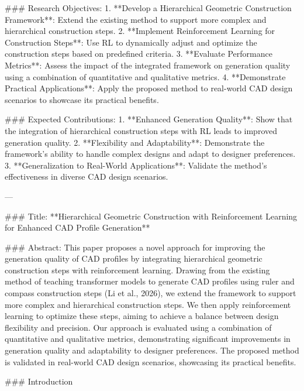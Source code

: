 ### Research Objectives:
1. **Develop a Hierarchical Geometric Construction Framework**: Extend the existing method to support more complex and hierarchical construction steps.
2. **Implement Reinforcement Learning for Construction Steps**: Use RL to dynamically adjust and optimize the construction steps based on predefined criteria.
3. **Evaluate Performance Metrics**: Assess the impact of the integrated framework on generation quality using a combination of quantitative and qualitative metrics.
4. **Demonstrate Practical Applications**: Apply the proposed method to real-world CAD design scenarios to showcase its practical benefits.

### Expected Contributions:
1. **Enhanced Generation Quality**: Show that the integration of hierarchical construction steps with RL leads to improved generation quality.
2. **Flexibility and Adaptability**: Demonstrate the framework’s ability to handle complex designs and adapt to designer preferences.
3. **Generalization to Real-World Applications**: Validate the method’s effectiveness in diverse CAD design scenarios.

---

### Title:
**Hierarchical Geometric Construction with Reinforcement Learning for Enhanced CAD Profile Generation**

### Abstract:
This paper proposes a novel approach for improving the generation quality of CAD profiles by integrating hierarchical geometric construction steps with reinforcement learning. Drawing from the existing method of teaching transformer models to generate CAD profiles using ruler and compass construction steps (Li et al., 2026), we extend the framework to support more complex and hierarchical construction steps. We then apply reinforcement learning to optimize these steps, aiming to achieve a balance between design flexibility and precision. Our approach is evaluated using a combination of quantitative and qualitative metrics, demonstrating significant improvements in generation quality and adaptability to designer preferences. The proposed method is validated in real-world CAD design scenarios, showcasing its practical benefits.

### Introduction

